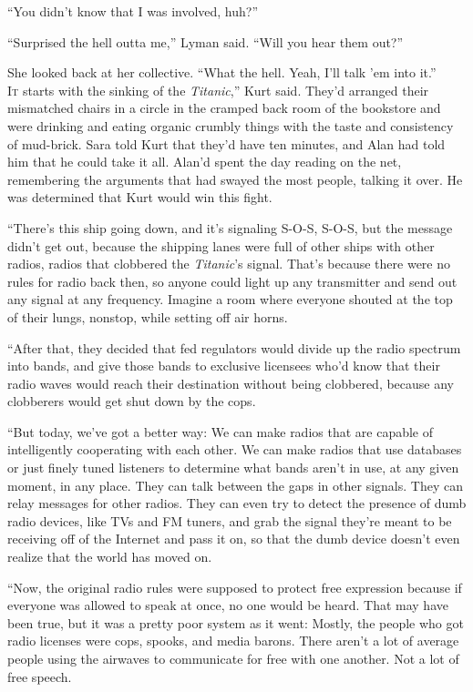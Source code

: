 ``You didn't know that I was involved, huh?''

``Surprised the hell outta me,'' Lyman said.  ``Will you hear them
out?''

She looked back at her collective.  ``What the hell.  Yeah, I'll talk
'em into it.''
\\
\lettrine[lines=3, lhang=.5, nindent=0pt, findent=2pt]{I}{t}
starts with the sinking of the \textit{Titanic},'' Kurt said. 
They'd arranged their mismatched chairs in a circle in the cramped
back room of the bookstore and were drinking and eating organic
crumbly things with the taste and consistency of mud-brick.  Sara told
Kurt that they'd have ten minutes, and Alan had told him that he could
take it all.  Alan'd spent the day reading on the net, remembering the
arguments that had swayed the most people, talking it over.  He was
determined that Kurt would win this fight.

``There's this ship going down, and it's signaling S-O-S, S-O-S, but
the message didn't get out, because the shipping lanes were full of
other ships with other radios, radios that clobbered the
\textit{Titanic}'s signal.  That's because there were no rules for
radio back then, so anyone could light up any transmitter and send out
any signal at any frequency.  Imagine a room where everyone shouted at
the top of their lungs, nonstop, while setting off air horns.

``After that, they decided that fed regulators would divide up the
radio spectrum into bands, and give those bands to exclusive licensees
who'd know that their radio waves would reach their destination
without being clobbered, because any clobberers would get shut down by
the cops.

``But today, we've got a better way:  We can make radios that are
capable of intelligently cooperating with each other.  We can make
radios that use databases or just finely tuned listeners to determine
what bands aren't in use, at any given moment, in any place.  They can
talk between the gaps in other signals.  They can relay messages for
other radios.  They can even try to detect the presence of dumb radio
devices, like TVs and FM tuners, and grab the signal they're meant to
be receiving off of the Internet and pass it on, so that the dumb
device doesn't even realize that the world has moved on.

``Now, the original radio rules were supposed to protect free
expression because if everyone was allowed to speak at once, no one
would be heard.  That may have been true, but it was a pretty poor
system as it went:  Mostly, the people who got radio licenses were
cops, spooks, and media barons.  There aren't a lot of average people
using the airwaves to communicate for free with one another.  Not a
lot of free speech.

